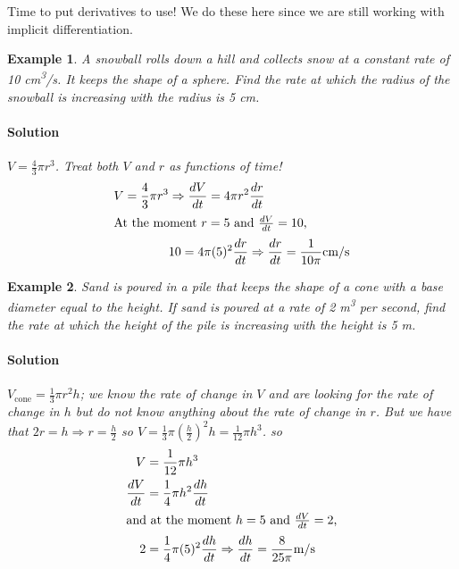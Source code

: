 \documentclass[letterpaper, 11pt, openany]{book}
\theoremstyle{mytheoremstyle}
\theoremstyle{myexamplestyle}
\newtheorem{example}{Example}[section]
\newenvironment{solution}{\paragraph{\sffamily \smaller \fontseries{b}\selectfont Solution}}{\hfill\faSquare}
\begin{document}
Time to put derivatives to use! We do these here since we are still working with implicit differentiation.

\begin{example}\label{e:rel-rates-sphere}
    A snowball rolls down a hill and collects snow at a constant rate of 10 cm\textsuperscript{3}/s. It keeps the shape of a sphere. Find the rate at which the radius of the snowball is increasing with the radius is 5 cm.
    \begin{solution}
            \(V = \frac{4}{3}\pi r^{3}\). Treat both \(V\) and \(r\) as functions of time!
            \begin{align*}
                V = \frac{4}{3}\pi r^{3} &\Rightarrow \frac{dV}{dt} = 4\pi r^{2} \frac{dr}{dt}\\
                \intertext{At the moment \(r = 5\) and \(\frac{dV}{dt} = 10\),}
                                        &10 = 4\pi (5)^{2}\frac{dr}{dt} \Rightarrow \frac{dr}{dt} = \frac{1}{10\pi} \text{cm/s}
            \end{align*}
    \end{solution}
\end{example}

\begin{example}\label{e:rel-rates-cone}
    Sand is poured in a pile that keeps the shape of a cone with a base diameter equal to the height. If sand is poured at a rate of 2 m\textsuperscript{3} per second, find the rate at which the height of the pile is increasing with the height is 5 m.
    \begin{solution}
        \(V_{\text{cone}} = \frac{1}{3}\pi r^2 h\); we know the rate of change in \(V\) and are looking for the rate of change in \(h\) but do not know anything about the rate of change in \(r\). But we have that \(2r = h \Rightarrow r = \frac{h}{2}\) so \(V = \frac{1}{3}\pi \left(\frac{h}{2}\right)^2 h = \frac{1}{12}\pi h^3\). so
        \begin{align*}
            V &= \frac{1}{12}\pi h^3 \\
            \frac{dV}{dt} &= \frac{1}{4}\pi h^2 \frac{dh}{dt}\\
            \intertext{and at the moment \(h=5\) and \(\frac{dV}{dt} = 2\),}
            2 &= \frac{1}{4} \pi (5)^2 \frac{dh}{dt} \Rightarrow \frac{dh}{dt} = \frac{8}{25\pi} \text{m/s}
        \end{align*}
    \end{solution}
\end{example}
\end{document}
